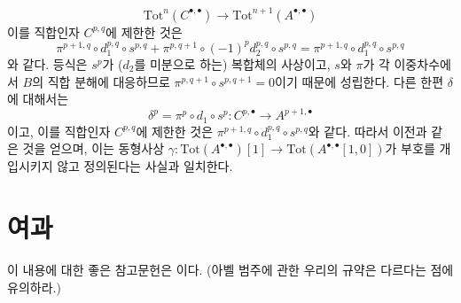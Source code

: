 \begin{remark}
$$\text{Tot}^n(C^{\bullet, \bullet}) \to
\text{Tot}^{n + 1}(A^{\bullet, \bullet})
$$
이를 직합인자 $C^{p, q}$에 제한한 것은
$$
\pi^{p + 1, q} \circ
d_1^{p, q} \circ
s^{p, q} +
\pi^{p, q + 1} \circ
(-1)^p d_2^{p, q} \circ
s^{p, q} =
\pi^{p + 1, q} \circ
d_1^{p, q} \circ
s^{p, q}
$$
와 같다. 등식은 $s^p$가 ($d_2$를 미분으로 하는) 복합체의 사상이고,
$s$와 $\pi$가 각 이중차수에서 $B$의 직합 분해에 대응하므로
$\pi^{p, q + 1} \circ s^{p, q + 1} = 0$이기 때문에 성립한다.
다른 한편 $\delta$에 대해서는
$$
\delta^p =  \pi^p \circ d_1 \circ s^p :
C^{p, \bullet} \to A^{p + 1, \bullet}
$$
이고, 이를 직합인자 $C^{p, q}$에 제한한 것은
$\pi^{p + 1, q} \circ d_1^{p, q} \circ s^{p, q}$와 같다.
따라서 이전과 같은 것을 얻으며, 이는 동형사상
$\gamma : \text{Tot}(A^{\bullet, \bullet})[1] \to
\text{Tot}(A^{\bullet, \bullet}[1, 0])$가 부호를 개입시키지 않고
정의된다는 사실과 일치한다.
\end{remark}







\section{여과}
\label{section-filtrations}

\noindent
이 내용에 대한 좋은 참고문헌은 \cite[Section 1]{HodgeII}이다.
(아벨 범주에 관한 우리의 규약은 다르다는 점에 유의하라.)

